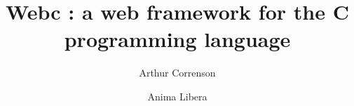 \documentclass[french]{article}
\begin{document}
    \title{Webc : a web framework for the C programming language}
    \author{Arthur Correnson \and Anima Libera}
    \maketitle
\end{document}
